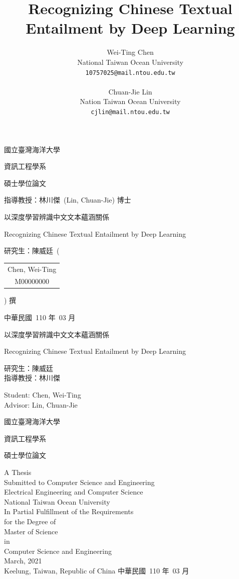 \documentclass{article}
\title{Recognizing Chinese Textual Entailment by Deep Learning}
\author{
    Wei-Ting Chen\\
    National Taiwan Ocean University\\
    \texttt{10757025@mail.ntou.edu.tw}\\
    \\
    Chuan-Jie Lin\\
    Nation Taiwan Ocean University\\
    \texttt{cjlin@mail.ntou.edu.tw}\\
    }
\begin{document}
    \begin{CJK*}{UTF8}{bkai}

      \begin{titlepage}
  \centering
  {\Huge 國立臺灣海洋大學\par}
  \vspace{1cm}
  {\huge 資訊工程學系\par}
  \vspace{1cm}
  {\huge 碩士學位論文\par}
  \vspace{2cm}
  {\LARGE 指導教授：林川傑\ (Lin, Chuan-Jie) 博士\par}
  \vfill
  {\LARGE 以深度學習辨識中文文本蘊涵關係\par}
  {\LARGE Recognizing Chinese Textual Entailment by Deep Learning\par}
  \vfill
  {\LARGE 研究生：陳威廷\ \bigg(
    \begin{tabular}{c}
      Chen, Wei-Ting \\
      M00000000
    \end{tabular}
    \bigg) 撰}
    \vfill
    {\LARGE 中華民國\ 110 年\ 03 月}
  \end{titlepage}

  \newpage

  \begin{titlepage}
    \centering
  {\LARGE 以深度學習辨識中文文本蘊涵關係\par}
  \vfill
  {\LARGE Recognizing Chinese Textual Entailment by Deep Learning\par}
  \vfill
  {
    \LARGE
    \begin{minipage}{2in}
      研究生：陳威廷 \\
      指導教授：林川傑
    \end{minipage}
    \hfill
    \begin{minipage}{2.4in}
      Student: Chen, Wei-Ting \\
      Advisor: Lin, Chuan-Jie
    \end{minipage}
    \par
    }
    \vfill
    {\LARGE 國立臺灣海洋大學\par}
    {\LARGE 資訊工程學系\par}
    {\LARGE 碩士學位論文\par}
    \vfill
    {
      \LARGE
      A Thesis \\
      Submitted to Computer Science and Engineering \\
      Electrical Engineering and Computer Science \\
      National Taiwan Ocean University \\
      In Partial Fulfillment of the Requirements \\
      for the Degree of \\
      Master of Science \\
      in \\
      Computer Science and Engineering \\
      March, 2021 \\ \vspace{0.5cm}
      Keelung, Taiwan, Republic of China
      }
      \vfill
      {\LARGE 中華民國\ 110 年\ 03 月}
\end{titlepage}


\end{CJK*}
\end{document}
